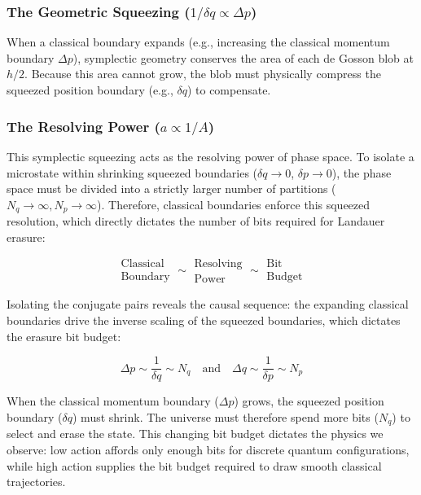 \documentclass[%
  aps, reprint, prl, amsmath,amssymb
]{revtex4-2}
\begin{document}
\subsubsection{The Geometric Squeezing ($1/\delta q \propto \Delta p$)}
When a classical boundary expands (e.g., increasing the classical momentum boundary $\Delta p$), symplectic geometry conserves the area of each de Gosson blob at $h/2$. Because this area cannot grow, the blob must physically compress the squeezed position boundary (e.g., $\delta q$) to compensate.

\subsubsection{The Resolving Power ($a \propto 1/A$)}
This symplectic squeezing acts as the resolving power of phase space. To isolate a microstate within shrinking squeezed boundaries ($\delta q \to 0$, $\delta p \to 0$), the phase space must be divided into a strictly larger number of partitions ($N_q \to \infty, N_p \to \infty$). Therefore, classical boundaries enforce this squeezed resolution, which directly dictates the number of bits required for Landauer erasure:

\begin{equation}
\label{eq:ResolvingPowerPlain}
\substack{\text{Classical} \\ \text{Boundary}}
\sim
\substack{\text{Resolving} \\ \text{Power}}
\sim
\substack{\text{Bit} \\ \text{Budget}}
\end{equation}

Isolating the conjugate pairs reveals the causal sequence: the expanding classical boundaries drive the inverse scaling of the squeezed boundaries, which dictates the erasure bit budget:

\begin{equation}
\label{eq:BitBudgetResolutionCoordinate}
\Delta p \sim \frac{1}{\delta q} \sim N_q 
\quad \text{and} \quad
\Delta q \sim \frac{1}{\delta p} \sim N_p 
\end{equation}

When the classical momentum boundary ($\Delta p$) grows, the squeezed position boundary ($\delta q$) must shrink. The universe must therefore spend more bits ($N_q$) to select and erase the state. This changing bit budget dictates the physics we observe: low action affords only enough bits for discrete quantum configurations, while high action supplies the bit budget required to draw smooth classical trajectories.
\end{document}
